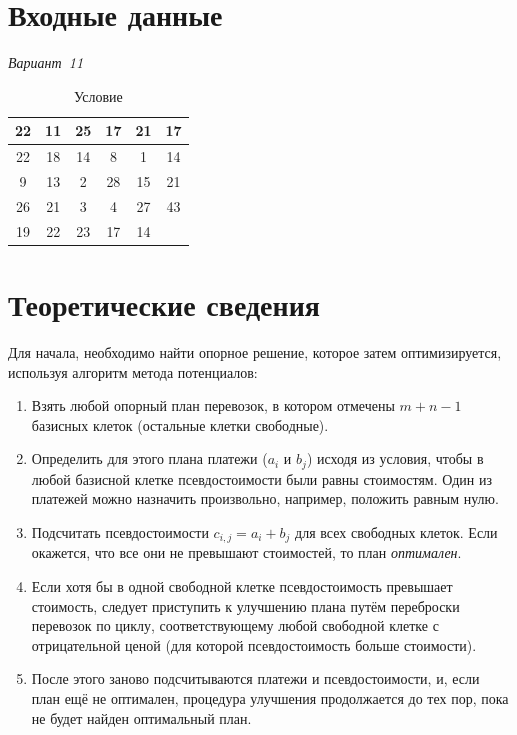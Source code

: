 \documentclass[a4paper,12pt,notitlepage,headsepline,pdftex]{scrartcl}
\begin{document}
\section{Входные данные}
  \hfill\emph{Вариант~11}
  \begin{table}[h]
    \centering
    \begin{tabular}{|c|c|c|c|c||c|}
        \hline
        22 & 11 & 25 & 17 & 21 & 17\\
        \hline
        22 & 18 & 14 & 8 & 1 & 14\\
        \hline
        9 & 13 & 2 & 28 & 15 & 21\\
        \hline
        26 & 21 & 3 & 4 & 27 & 43\\
        \hline
        \hline
        19 & 22 & 23 & 17 & 14 & \\
        \hline
    \end{tabular}
    \caption{Условие}
    \label{tab:task}
  \end{table}
  \newpage
\section{Теоретические сведения}
  Для начала, необходимо найти опорное решение, которое затем оптимизируется,
  используя алгоритм метода потенциалов:
  \begin{enumerate}
    \item Взять любой опорный план перевозок, в котором отмечены $m + n - 1$
      базисных клеток (остальные клетки свободные).
    \item Определить для этого плана платежи ($a_i$ и $b_j$) исходя из
      условия, чтобы в любой базисной клетке псевдостоимости были равны
      стоимостям.
      Один из платежей можно назначить произвольно, например, положить равным
      нулю.
    \item Подсчитать псевдостоимости $c_{i,j} = a_i + b_j$ для всех свободных
      клеток.
      Если окажется, что все они не превышают стоимостей, то план
      \emph{оптимален}.
    \item Если хотя бы в одной свободной клетке псевдостоимость превышает
      стоимость, следует приступить к улучшению плана путём переброски
      перевозок по циклу, соответствующему любой свободной клетке с
      отрицательной ценой (для которой псевдостоимость больше стоимости).
    \item После этого заново подсчитываются платежи и псевдостоимости, и, если
      план ещё не оптимален, процедура улучшения продолжается до тех пор, пока
      не будет найден оптимальный план.
  \end{enumerate}
\end{document}
